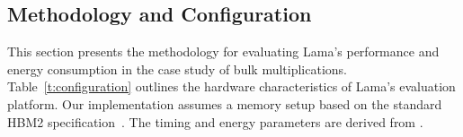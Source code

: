 \begin{table}[t!]
\caption{Parameters for different operand bitwidths in Lama MUL.}
\label{t:mult_different_precisions}
\begin{center}
\end{center}
\vskip -0.1in
\end{table}


\subsection{Methodology and Configuration}
This section presents the methodology for evaluating Lama's performance and energy consumption in the case study of bulk multiplications. Table~\ref{t:configuration} outlines the hardware characteristics of Lama's evaluation platform. Our implementation assumes a memory setup based on the standard HBM2 specification~\cite{jedec}. The timing and energy parameters are derived from \cite{fine-grained}.

